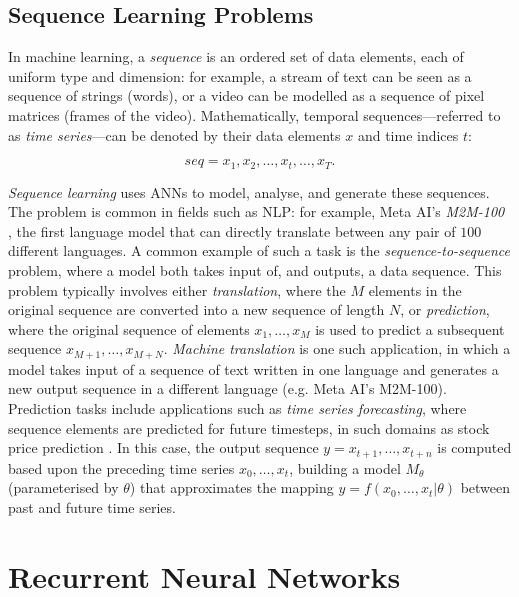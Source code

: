 \documentclass[a4paper, 11pt]{report}
\begin{document}
    \subsection{Sequence Learning Problems}

    In machine learning, a \emph{sequence} is an ordered set of data elements, each of uniform type and dimension: for example, a stream of text can be seen as a sequence of strings (words), or a video can be modelled as a sequence of pixel matrices (frames of the video). Mathematically, temporal sequences---referred to as \emph{time series}---can be denoted by their data elements $x$ and time indices $t$:

    \begin{equation}
        \label{eq: timeseries}
        seq = x_1, x_2, \ldots, x_t, \ldots, x_T
        \text{.}
    \end{equation}

    \emph{Sequence learning} uses ANNs to model, analyse, and generate these sequences. The problem is common in fields such as NLP: for example, Meta AI's \emph{M2M-100} \citep{fan-2020}, the first language model that can directly translate between any pair of $100$ different languages. A common example of such a task is the \emph{sequence-to-sequence} problem, where a model both takes input of, and outputs, a data sequence. This problem typically involves either \emph{translation}, where the $M$ elements in the original sequence are converted into a new sequence of length $N$, or \emph{prediction}, where the original sequence of elements $x_1, \ldots, x_M$ is used to predict a subsequent sequence $x_{M+1}, \ldots, x_{M+N}$. \emph{Machine translation} is one such application, in which a model takes input of a sequence of text written in one language and generates a new output sequence in a different language (e.g. Meta AI's M2M-100). Prediction tasks include applications such as \emph{time series forecasting}, where sequence elements are predicted for future timesteps, in such domains as stock price prediction \citep{darapaneni-2022}. In this case, the output sequence $y = x_{t+1}, \ldots, x_{t+n}$ is computed based upon the preceding time series $x_0, \ldots, x_t$, building a model $M_{\theta}$ (parameterised by $\theta$) that approximates the mapping $y = f ( x_0, \ldots, x_t \lvert \theta )$ between past and future time series.


    \section{Recurrent Neural Networks}
\end{document}
